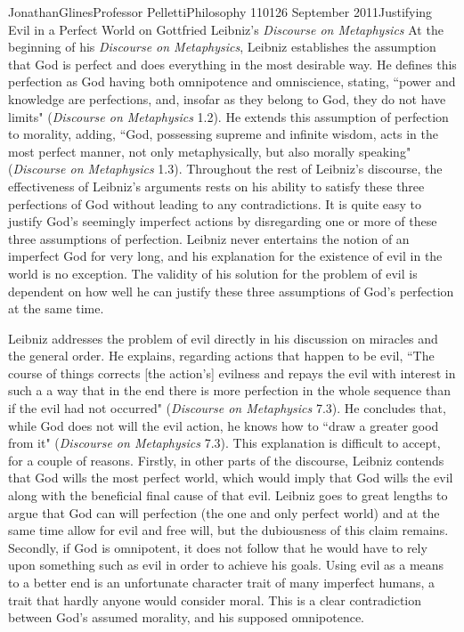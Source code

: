 \documentclass[12pt,letterpaper]{article}
\begin{document}
\begin{mla}{Jonathan}{Glines}{Professor Pelletti}{Philosophy 1101}{26 September 2011}{Justifying Evil in a Perfect World on Gottfried Leibniz's \textit{Discourse on Metaphysics}}
At the beginning of his \textit{Discourse on Metaphysics}, Leibniz establishes the assumption that God is perfect and does everything in the most desirable way. He defines this perfection as God having both omnipotence and omniscience, stating, ``power and knowledge are perfections, and, insofar as they belong to God, they do not have limits" (\textit{Discourse on Metaphysics} 1.2). He extends this assumption of perfection to morality, adding, ``God, possessing supreme and infinite wisdom, acts in the most perfect manner, not only metaphysically, but also morally speaking" (\textit{Discourse on Metaphysics} 1.3). Throughout the rest of Leibniz's discourse, the effectiveness of Leibniz's arguments rests on his ability to satisfy these three perfections of God without leading to any contradictions. It is quite easy to justify God's seemingly imperfect actions by disregarding one or more of these three assumptions of perfection. Leibniz never entertains the notion of an imperfect God for very long, and his explanation for the existence of evil in the world is no exception. The validity of his solution for the problem of evil is dependent on how well he can justify these three assumptions of God's perfection at the same time.

Leibniz addresses the problem of evil directly in his discussion on miracles and the general order. He explains, regarding actions that happen to be evil, ``The course of things corrects [the action's] evilness and repays the evil with interest in such a a way that in the end there is more perfection in the whole sequence than if the evil had not occurred" (\textit{Discourse on Metaphysics} 7.3). He concludes that, while God does not will the evil action, he knows how to ``draw a greater good from it" (\textit{Discourse on Metaphysics} 7.3). This explanation is difficult to accept, for a couple of reasons. Firstly, in other parts of the discourse, Leibniz contends that God wills the most perfect world, which would imply that God wills the evil along with the beneficial final cause of that evil. Leibniz goes to great lengths to argue that God can will perfection (the one and only perfect world) and at the same time allow for evil and free will, but the dubiousness of this claim remains. Secondly, if God is omnipotent, it does not follow that he would have to rely upon something such as evil in order to achieve his goals. Using evil as a means to a better end is an unfortunate character trait of many imperfect humans, a trait that hardly anyone would consider moral. This is a clear contradiction between God's assumed morality, and his supposed omnipotence.


\end{mla}
\end{document}
